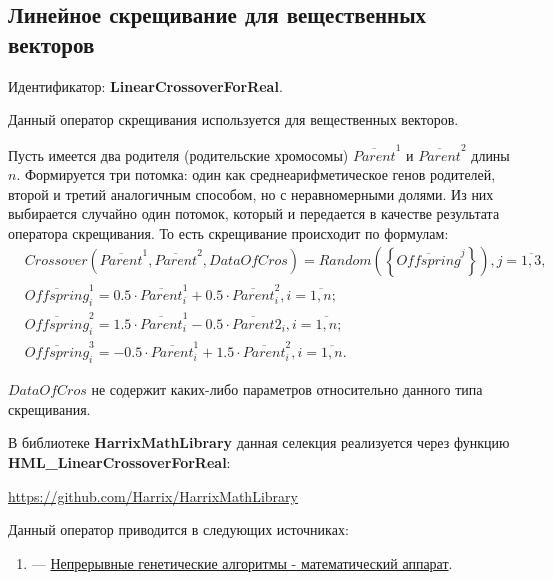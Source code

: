 \subsection{Линейное скрещивание для вещественных векторов}\label{SetOfOperatorsAlgorithms:LinearCrossoverForReal}

Идентификатор: \textbf{LinearCrossoverForReal}.

Данный оператор скрещивания используется для вещественных векторов.

Пусть имеется два родителя (родительские хромосомы) $ \overline{Parent}^1 $ и $ \overline{Parent}^2$ длины $n$. Формируется три потомка: один как среднеарифметическое генов родителей, второй и третий аналогичным способом, но с неравномерными долями.  Из них выбирается случайно один потомок, который и передается в качестве результата оператора скрещивания. То есть скрещивание происходит по формулам:
\begin{align}
\label{SetOfOperatorsAlgorithms:eq:LinearCrossoverForReal}
&Crossover \left( \overline{Parent}^1, \overline{Parent}^2, DataOfCros\right)=Random \left(\left\lbrace \overline{Offspring}^j\right\rbrace  \right), j=\overline{1,3}, \\
& \overline{Offspring}^1_i=0.5\cdot\overline{Parent}^1_i+0.5\cdot\overline{Parent}^2_i , i=\overline{1,n};\nonumber\\
&\overline{Offspring}^2_i=1.5\cdot\overline{Parent}^1_i-0.5\cdot\overline{Parent}2_i , i=\overline{1,n};\nonumber\\
&\overline{Offspring}^3_i=-0.5\cdot\overline{Parent}^1_i+1.5\cdot\overline{Parent}^2_i , i=\overline{1,n}.\nonumber
\end{align}

$ DataOfCros $ не содержит каких-либо параметров относительно данного типа скрещивания.

В библиотеке \textbf{HarrixMathLibrary} данная селекция реализуется через функцию \textbf{HML\_LinearCrossoverForReal}:

\href{https://github.com/Harrix/HarrixMathLibrary}{https://github.com/Harrix/HarrixMathLibrary}

Данный оператор приводится в следующих источниках:

\begin{enumerate}
\item \cite{web:basegroup.ru:real_coded_ga} ---  \href{http://www.basegroup.ru/library/optimization/real_coded_ga/}{Непрерывные генетические алгоритмы - математический аппарат}.
\end{enumerate}